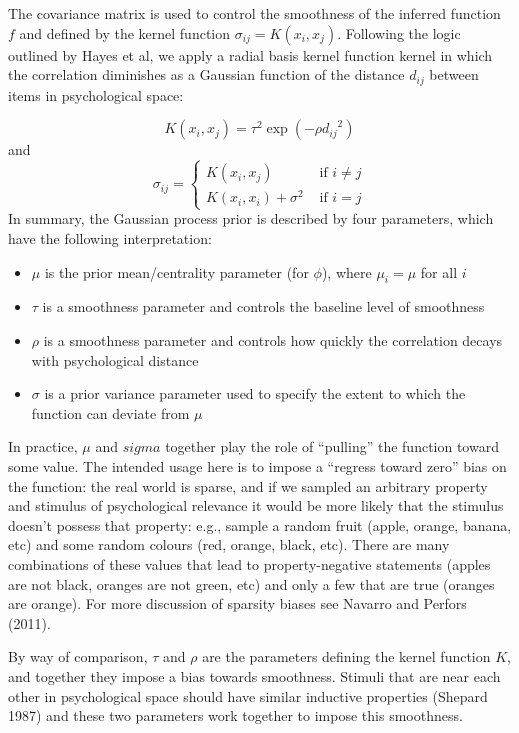 \documentclass[
  english,
  doc]{apa6}
\providecommand{\tightlist}{%
  \setlength{\itemsep}{0pt}\setlength{\parskip}{0pt}}
\begin{document}
\noindent
The covariance matrix is used to control the smoothness of the inferred function \(f\) and defined by the kernel function \(\sigma_{ij} = K(x_i, x_j)\). Following the logic outlined by Hayes et al, we apply a radial basis kernel function kernel in which the correlation diminishes as a Gaussian function of the distance \(d_{ij}\) between items in psychological space:

\[
K(x_i, x_j) = \tau^2 \exp\left(-\rho {d_{ij}}^2\right)
\]
and
\[
\sigma_{ij} = \left\{ \begin{array}{rl} K(x_i, x_j) & \mbox{ if } i \neq j \\ K(x_i, x_i) + \sigma^2 & \mbox{ if } i = j \end{array}  \right.
\]
\noindent
In summary, the Gaussian process prior is described by four parameters, which have the following interpretation:

\begin{itemize}
\tightlist
\item
  \(\mu\) is the prior mean/centrality parameter (for \(\phi\)), where \(\mu_i = \mu\) for all \(i\)
\item
  \(\tau\) is a smoothness parameter and controls the baseline level of smoothness
\item
  \(\rho\) is a smoothness parameter and controls how quickly the correlation decays with psychological distance
\item
  \(\sigma\) is a prior variance parameter used to specify the extent to which the function can deviate from \(\mu\)
\end{itemize}

\noindent
In practice, \(\mu\) and \(sigma\) together play the role of \enquote{pulling} the function toward some value. The intended usage here is to impose a \enquote{regress toward zero} bias on the function: the real world is sparse, and if we sampled an arbitrary property and stimulus of psychological relevance it would be more likely that the stimulus doesn't possess that property: e.g., sample a random fruit (apple, orange, banana, etc) and some random colours (red, orange, black, etc). There are many combinations of these values that lead to property-negative statements (apples are not black, oranges are not green, etc) and only a few that are true (oranges are orange). For more discussion of sparsity biases see Navarro and Perfors (2011).

By way of comparison, \(\tau\) and \(\rho\) are the parameters defining the kernel function \(K\), and together they impose a bias towards smoothness. Stimuli that are near each other in psychological space should have similar inductive properties (Shepard 1987) and these two parameters work together to impose this smoothness.
\end{document}
